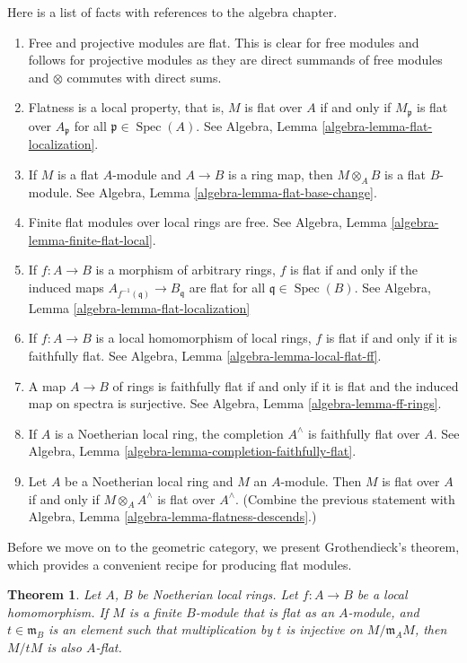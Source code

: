 \documentclass{stacks-project}
\theoremstyle{plain}
\newtheorem{theorem}[subsection]{Theorem}
\theoremstyle{definition}
\theoremstyle{remark}
\numberwithin{equation}{subsection}
\def\Spec{\mathop{\mathrm{Spec}}}
\begin{document}
\noindent
Here is a list of facts with references to the algebra chapter.
\begin{enumerate}
\item Free and projective modules are flat. This is clear for free modules
and follows for projective modules as they are direct summands of free
modules and $\otimes$ commutes with direct sums.
\item Flatness is a local property, that is, $M$ is flat over $A$
if and only if $M_{\mathfrak p}$ is flat over $A_{\mathfrak p}$ for all
$\mathfrak p \in \Spec(A)$.
See Algebra, Lemma \ref{algebra-lemma-flat-localization}.
\item If $M$ is a flat $A$-module and $A \to B$ is a ring map,
then $M \otimes_A B$ is a flat $B$-module. See
Algebra, Lemma \ref{algebra-lemma-flat-base-change}.
\item Finite flat modules over local rings are free.
See Algebra, Lemma \ref{algebra-lemma-finite-flat-local}.
\item If $f : A \to B$ is a morphism of arbitrary rings,
$f$ is flat if and only if the induced maps
$A_{f^{-1}(\mathfrak q)} \to B_{\mathfrak q}$ are flat for all
$\mathfrak q \in \Spec(B)$.
See Algebra, Lemma \ref{algebra-lemma-flat-localization}
\item If $f : A \to B$ is a local homomorphism of local rings,
$f$ is flat if and only if it is faithfully flat.
See Algebra, Lemma \ref{algebra-lemma-local-flat-ff}.
\item A map $A \to B$ of rings is faithfully flat if and only if it is
flat and the induced map on spectra is surjective.
See Algebra, Lemma \ref{algebra-lemma-ff-rings}.
\item If $A$ is a Noetherian local ring, the completion
$A^\wedge$ is faithfully flat over $A$.
See Algebra, Lemma \ref{algebra-lemma-completion-faithfully-flat}.
\item Let $A$ be a Noetherian local ring and $M$ an $A$-module.
Then $M$ is flat over $A$ if and only if $M \otimes_A A^\wedge$
is flat over $A^\wedge$. (Combine the previous statement with
Algebra, Lemma \ref{algebra-lemma-flatness-descends}.)
\end{enumerate}
Before we move on to the geometric category, we present Grothendieck's
theorem, which provides a convenient recipe for producing flat
modules.

\begin{theorem}
\label{theorem-flatness-grothendieck}
Let $A$, $B$ be Noetherian local rings.
Let $f : A \to B$ be a local homomorphism.
If $M$ is a finite $B$-module that is flat as an $A$-module,
and $t \in \mathfrak m_B$ is an element such that multiplication
by $t$ is injective on $M/\mathfrak m_AM$, then $M/tM$ is also $A$-flat.
\end{theorem}
\end{document}
